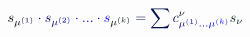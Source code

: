 \documentclass[12pt]{article}
\begin{document}
\makeatletter
\renewcommand*{\@textcolor}[3]{%
  \protect\leavevmode
  \begingroup
    \color#1{#2}#3%
  \endgroup
}
\makeatother
\begin{displaymath}
\mathcolor[RGB]{0,0,15}{s} _ { \mathcolor[RGB]{0,0,30}{\mu} ^ { \mathcolor[RGB]{0,0,45}{(} \mathcolor[RGB]{0,0,60}{1} \mathcolor[RGB]{0,0,75}{)} } } \mathcolor[RGB]{0,0,90}{\cdot} \mathcolor[RGB]{0,0,105}{s} _ { \mathcolor[RGB]{0,0,120}{\mu} ^ { \mathcolor[RGB]{0,0,135}{(} \mathcolor[RGB]{0,0,150}{2} \mathcolor[RGB]{0,0,165}{)} } } \mathcolor[RGB]{0,0,180}{\cdot} \mathcolor[RGB]{0,0,195}{.} \mathcolor[RGB]{0,0,210}{.} \mathcolor[RGB]{0,0,225}{.} \mathcolor[RGB]{0,0,240}{\cdot} \mathcolor[RGB]{0,0,255}{s} _ { \mathcolor[RGB]{0,15,0}{\mu} ^ { \mathcolor[RGB]{0,15,15}{(} \mathcolor[RGB]{0,15,30}{k} \mathcolor[RGB]{0,15,45}{)} } } \mathcolor[RGB]{0,15,60}{=} \mathcolor[RGB]{0,15,75}{\sum} \mathcolor[RGB]{0,15,90}{c} _ { \mathcolor[RGB]{0,15,105}{\mu} ^ { \mathcolor[RGB]{0,15,120}{(} \mathcolor[RGB]{0,15,135}{1} \mathcolor[RGB]{0,15,150}{)} } \mathcolor[RGB]{0,15,165}{.} \mathcolor[RGB]{0,15,180}{.} \mathcolor[RGB]{0,15,195}{.} \mathcolor[RGB]{0,15,210}{\mu} ^ { \mathcolor[RGB]{0,15,225}{(} \mathcolor[RGB]{0,15,240}{k} \mathcolor[RGB]{0,15,255}{)} } } ^ { \mathcolor[RGB]{0,30,0}{\nu} } \mathcolor[RGB]{0,30,15}{s} _ { \mathcolor[RGB]{0,30,30}{\nu} }
\end{displaymath}
\end{document}

